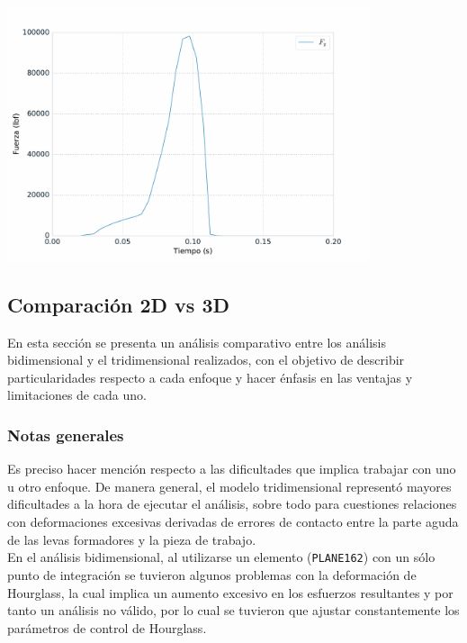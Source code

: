 \begin{center}
\includegraphics[width=0.8\textwidth]{src/ch4/fuerza_formado_3d_02.pdf}
\label{fig:fuerza_formado_3d_02}
\end{center}

\subsection{Comparación 2D vs 3D}

En esta sección se presenta un análisis comparativo entre los análisis bidimensional 
y el tridimensional realizados, con el objetivo de describir particularidades respecto 
a cada enfoque y hacer énfasis en las ventajas y limitaciones de cada uno.\\

\subsubsection{Notas generales}

Es preciso hacer mención respecto a las dificultades que implica trabajar con uno u 
otro enfoque. De manera general, el modelo tridimensional representó mayores dificultades 
a la hora de ejecutar el análisis, sobre todo para cuestiones relaciones con deformaciones 
excesivas derivadas de errores de contacto entre la parte aguda de las levas formadores 
y la pieza de trabajo.\\

En el análisis bidimensional, al utilizarse un elemento (\texttt{PLANE162}) con un sólo punto 
de integración se tuvieron algunos problemas con la deformación de Hourglass, la cual implica 
un aumento excesivo en los esfuerzos resultantes y por tanto un análisis no válido, por 
lo cual se tuvieron que ajustar constantemente los parámetros de control de Hourglass.\\

